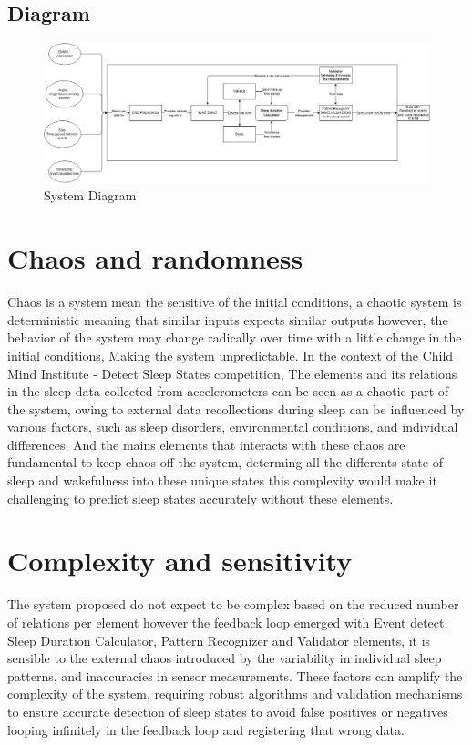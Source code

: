 \documentclass[conference]{IEEEtran}
\begin{document}
\subsection{Diagram}
\begin{figure}[H]
    \centering
    \includegraphics[width=\linewidth]{Workshop-1.JPG}
    \caption{System Diagram}
\end{figure}

\section{Chaos and randomness}
Chaos is a system mean the sensitive of the initial conditions,
a chaotic system is deterministic meaning that similar inputs expects similar outputs however,
the behavior of the system may change radically over time with a little change in the initial conditions,
Making the system unpredictable.
In the context of the Child Mind Institute - Detect Sleep States competition, The elements and its relations
in the sleep data collected from accelerometers can be seen as a chaotic part of the system, owing to external data recollections
during sleep can be influenced by various factors, such as sleep disorders, environmental conditions, and individual differences.
And the mains elements that interacts with these chaos are fundamental to keep chaos off the system, 
determing all the differents state of sleep and wakefulness into these unique states this complexity would make it
challenging to predict sleep states accurately without these elements. 
\section{Complexity and sensitivity}
The system proposed do not expect to be complex based on the reduced number of relations per element however the feedback 
loop emerged with Event detect, Sleep Duration Calculator, Pattern Recognizer and Validator elements, it is sensible to the 
external chaos introduced by the variability in individual sleep patterns, and inaccuracies in sensor measurements. 
These factors can amplify the complexity of the system, requiring robust algorithms and validation mechanisms to ensure accurate
detection of sleep states to avoid false positives or negatives looping infinitely in the feedback loop and registering that wrong
data.
\end{document}
